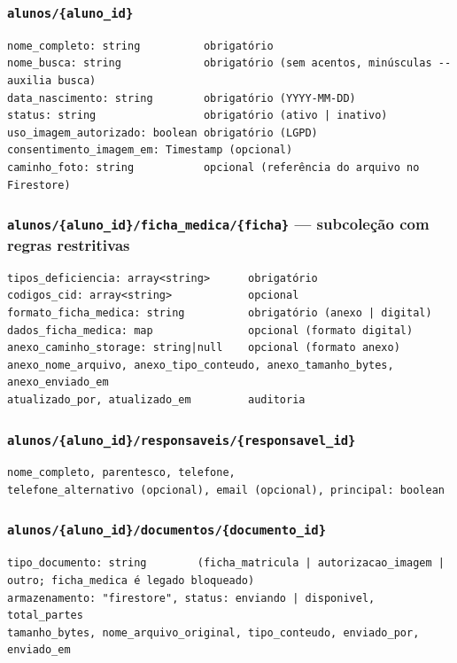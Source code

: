 \documentclass[a4paper,11pt]{article}
\begin{document}
\subsubsection*{\texttt{alunos/\{aluno\_id\}}}

\begin{verbatim}
nome_completo: string          obrigatório
nome_busca: string             obrigatório (sem acentos, minúsculas -- auxilia busca)
data_nascimento: string        obrigatório (YYYY-MM-DD)
status: string                 obrigatório (ativo | inativo)
uso_imagem_autorizado: boolean obrigatório (LGPD)
consentimento_imagem_em: Timestamp (opcional)
caminho_foto: string           opcional (referência do arquivo no Firestore)
\end{verbatim}

\subsubsection*{\texttt{alunos/\{aluno\_id\}/ficha\_medica/\{ficha\}} --- subcoleção com regras restritivas}

\begin{verbatim}
tipos_deficiencia: array<string>      obrigatório
codigos_cid: array<string>            opcional
formato_ficha_medica: string          obrigatório (anexo | digital)
dados_ficha_medica: map               opcional (formato digital)
anexo_caminho_storage: string|null    opcional (formato anexo)
anexo_nome_arquivo, anexo_tipo_conteudo, anexo_tamanho_bytes, anexo_enviado_em
atualizado_por, atualizado_em         auditoria
\end{verbatim}

\subsubsection*{\texttt{alunos/\{aluno\_id\}/responsaveis/\{responsavel\_id\}}}

\begin{verbatim}
nome_completo, parentesco, telefone,
telefone_alternativo (opcional), email (opcional), principal: boolean
\end{verbatim}

\subsubsection*{\texttt{alunos/\{aluno\_id\}/documentos/\{documento\_id\}}}

\begin{verbatim}
tipo_documento: string        (ficha_matricula | autorizacao_imagem | outro; ficha_medica é legado bloqueado)
armazenamento: "firestore", status: enviando | disponivel, total_partes
tamanho_bytes, nome_arquivo_original, tipo_conteudo, enviado_por, enviado_em
\end{verbatim}
\end{document}
